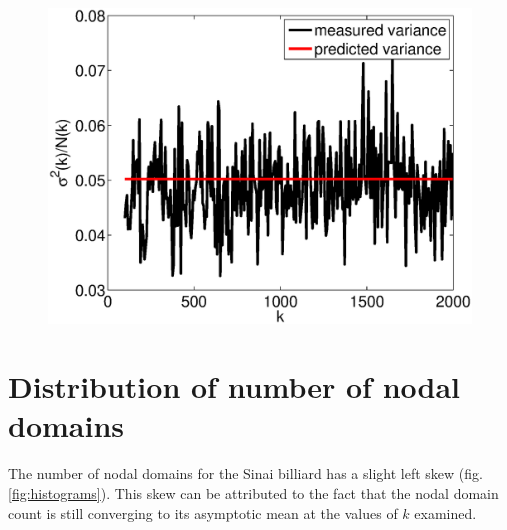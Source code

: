 \documentclass{report}
\begin{document}
\begin{figure}
  \begin{center}
    \includegraphics[width=\textwidth]{figs/results/perc_100_to_2000_variance.eps}
  \end{center}
\end{figure}

\section{Distribution of number of nodal domains}
The number of nodal domains for the Sinai billiard has a slight left skew (fig. \ref{fig:histograms}). This skew can be attributed to the fact that the nodal domain count is still converging to its asymptotic mean at the values of $k$ examined.
\end{document}
